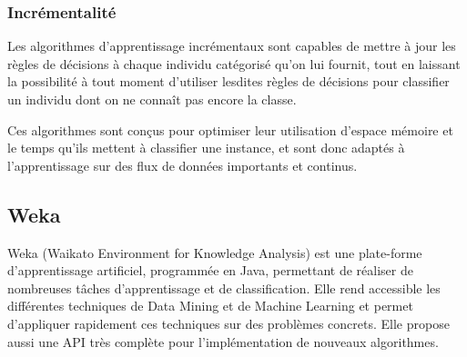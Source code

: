         \subsubsection{Incrémentalité}

            Les algorithmes d’apprentissage incrémentaux sont capables de mettre à jour les règles de décisions à chaque individu catégorisé qu’on lui fournit, tout en laissant la possibilité à tout moment d’utiliser lesdites règles de décisions pour classifier un individu dont on ne connaît pas encore la classe.

            Ces algorithmes sont conçus pour optimiser leur utilisation d'espace mémoire et le temps qu'ils mettent à classifier une instance, et sont donc adaptés à l'apprentissage sur des flux de données importants et continus.

    \subsection{Weka}

        Weka (Waikato Environment for Knowledge Analysis) est une plate-forme d'apprentissage artificiel, programmée en Java, permettant de réaliser de nombreuses tâches d’apprentissage et de classification. Elle rend accessible les différentes techniques de Data Mining et de Machine Learning et  permet d’appliquer rapidement ces techniques sur des problèmes concrets. Elle propose aussi une API très complète pour l'implémentation de nouveaux algorithmes.

